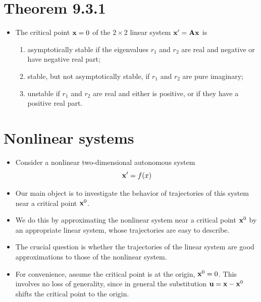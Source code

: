 \documentclass[11pt,a4paper]{article}
\begin{document}
	\section*{Theorem 9.3.1}
	\begin{itemize}
		\item The critical point $\vb{x} = 0$ of the $2 \times 2$ linear system $\vb{x}^\prime = \vb{Ax}$ is
		\begin{enumerate}[(1)]
			\item asymptotically stable if the eigenvalues $r_1$ and $r_2$ are real and negative or have negative real part;
			\item stable, but not asymptotically stable, if $r_1$ and $r_2$ are pure imaginary;
			\item unstable if $r_1$ and $r_2$ are real and either is positive, or if they have a positive real part.
		\end{enumerate}
	\end{itemize}
	\section*{Nonlinear systems}
	\begin{itemize}
		\item Consider a nonlinear two-dimensional autonomous system
		$$
		\vb{x}^\prime = f(x)
		$$
		\item Our main object is to investigate the behavior of trajectories of this system near a critical point $\vb{x}^0$.
		\item We do this by approximating the nonlinear system near a critical point $\vb{x}^0$ by an appropriate linear system, whose trajectories are easy to describe.
		\item The crucial question is whether the trajectories of the linear system are good approximations to those of the nonlinear system.
		\item For convenience, assume the critical point is at the origin, $\vb{x}^0 = 0$. This involves no loss of generality, since in general the substitution $\vb{u} = \vb{x}-\vb{x}^0$ shifts the critical point to the origin.
	\end{itemize}
\end{document}
